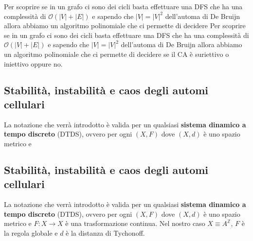 Per scoprire se in un grafo ci sono dei cicli basta effettuare una DFS che ha una
complessità di $\mathcal{O}(|V|+|E|)$ e sapendo che $|V|= |V|^2$ dell'automa di
De Bruijn allora abbiamo un algoritmo polinomiale che ci permette di decidere
Per scoprire se in un grafo ci sono dei cicli basta effettuare una DFS che ha una
complessità di $\mathcal{O}(|V|+|E|)$ e sapendo che $|V|= |V|^2$ dell'automa di
De Bruijn allora abbiamo un algoritmo polinomiale che ci permette di decidere
se il CA è suriettivo o iniettivo oppure no.

\subsection{Stabilità, instabilità e caos degli automi cellulari}
La notazione che verrà introdotto è valida per un qualsiasi \textbf{sistema dinamico a tempo
    discreto} (DTDS), ovvero per ogni $(X,F)$ dove $(X,d)$ è uno spazio metrico e
\subsection{Stabilità, instabilità e caos degli automi cellulari}
La notazione che verrà introdotto è valida per un qualsiasi \textbf{sistema dinamico a tempo
    discreto} (DTDS), ovvero per ogni $(X,F)$ dove $(X,d)$ è uno spazio metrico e
$F:X\rightarrow X$ è una trasformazione continua. Nel nostro caso $X \equiv A^\mathbb{Z}$,
$F$ è la regola globale e $d$ è la distanza di Tychonoff.

